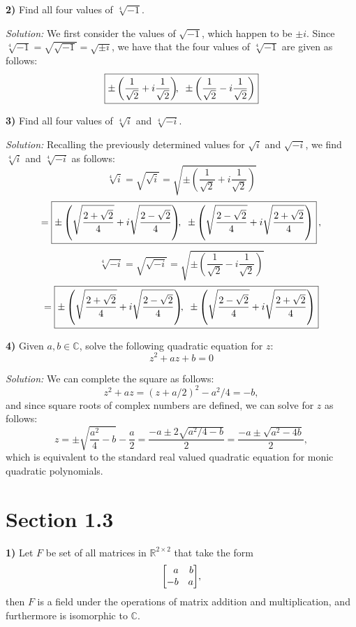 \documentclass[12pt]{article}
\newcommand{\R}{\ensuremath{\mathbb{R}}}
\newcommand{\C}{\ensuremath{\mathbb{C}}}
\newcommand{\parenb}[1]{\left(#1\right)}
\newcommand{\solution}{\textit{Solution: }}
\begin{document}
\textbf{2)}
Find all four values of \( \sqrt[4]{-1} \).

\solution
We first consider the values of \( \sqrt{-1} \), which happen to be
\( \pm i \).
Since \( \sqrt[4]{-1} = \sqrt{\sqrt{-1}} = \sqrt{\pm i} \), we have that the
four values of \( \sqrt[4]{-1} \) are given as follows:
\[
	\boxed{
		\pm\parenb{\frac{1}{\sqrt{2}} + i\frac{1}{\sqrt{2}}}
		\kern-0.05in,\kern0.075in
		\pm\parenb{\frac{1}{\sqrt{2}} - i\frac{1}{\sqrt{2}}}
	}
\]

\textbf{3)}
Find all four values of \( \sqrt[4]{i} \) and \( \sqrt[4]{-i} \).

\solution
Recalling the previously determined values for \( \sqrt{i} \) and
\( \sqrt{-i} \), we find \( \sqrt[4]{i} \) and \( \sqrt[4]{-i} \) as
follows:
\[
	\sqrt[4]{i}
	= \sqrt{\sqrt{i}}
	= \sqrt{\pm\parenb{\frac{1}{\sqrt{2}} + i\frac{1}{\sqrt{2}}}}
\]
\[
	= \boxed{
		\pm\parenb{
			\sqrt{\frac{2 + \sqrt{2}}{4}} + i\sqrt{\frac{2 - \sqrt{2}}{4}}
		}
		\kern-0.05in,\kern0.075in
		\pm\parenb{
			\sqrt{\frac{2 - \sqrt{2}}{4}} + i\sqrt{\frac{2 + \sqrt{2}}{4}}
		}
	}\kern0.025in,
\]
\[
	\sqrt[4]{-i}
	= \sqrt{\sqrt{-i}}
	= \sqrt{\pm\parenb{\frac{1}{\sqrt{2}} - i\frac{1}{\sqrt{2}}}}
\]
\[
	= \boxed{
		\pm\parenb{
			\sqrt{\frac{2 + \sqrt{2}}{4}} + i\sqrt{\frac{2 - \sqrt{2}}{4}}
		}
		\kern-0.05in,\kern0.075in
		\pm\parenb{
			\sqrt{\frac{2 - \sqrt{2}}{4}} + i\sqrt{\frac{2 + \sqrt{2}}{4}}
		}
	}
\]

\textbf{4)}
Given \( a, b \in \C \), solve the following quadratic equation for \( z \):
\[
	z^2 + az + b = 0
\]

\solution
We can complete the square as follows:
\[
	z^2 + az = (z + a/2)^2 - a^2/4 = -b,
\]
and since square roots of complex numbers are defined, we can solve for
\( z \) as follows:
\[
	z = \pm\sqrt{\frac{a^2}{4} - b} - \frac{a}{2}
	= \frac{-a \pm 2\sqrt{a^2/4 - b}}{2}
	= \frac{-a \pm \sqrt{a^2 - 4b}}{2},
\]
which is equivalent to the standard real valued quadratic equation for monic
quadratic polynomials.

\section*{Section 1.3}

\textbf{1)}
Let \( F \) be set of all matrices in \( \R^{2 \times 2} \) that take the form
\[
	\begin{bmatrix*}[r]
		a & b \\ -b & a
	\end{bmatrix*}
	\kern-0.025in,
\]
then \( F \) is a field under the operations of matrix addition and
multiplication, and furthermore is isomorphic to \C.
\end{document}
